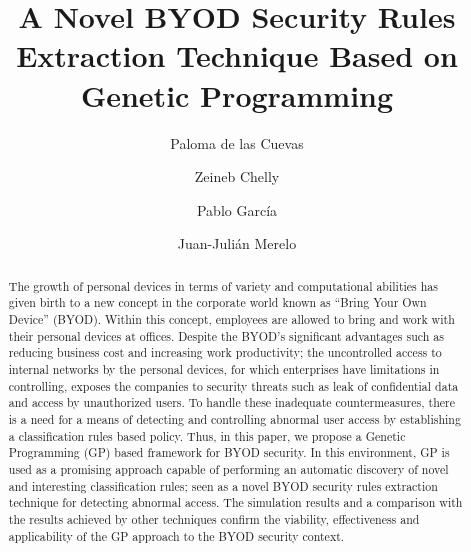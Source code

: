 \documentclass[runningheads,a4paper]{llncs}
\begin{document}
\mainmatter  %

\title{A Novel BYOD Security Rules Extraction Technique Based on Genetic Programming}


%
\author{Paloma de las Cuevas %
\and Zeineb Chelly \and Pablo Garc\'ia \and Juan-Juli\'an Merelo }
%


\maketitle


\begin{abstract}
The growth of personal devices in terms of variety and computational
abilities has given birth to a new concept in the corporate world
known as ``Bring Your Own Device'' (BYOD).
Within this concept,
employees are allowed to bring and work with their personal devices at
offices. Despite the BYOD's significant advantages such as reducing
business cost and increasing work productivity; the uncontrolled
access to internal networks by the personal devices, for which
enterprises have limitations in controlling, exposes the companies to
security threats such as leak of confidential data and access by
unauthorized users. To handle these inadequate countermeasures,
 there
is a need for a means of detecting and controlling abnormal user
access by establishing a classification rules based policy. Thus, in
this paper, we propose a Genetic Programming (GP) based framework for
BYOD security. In this environment, GP is used as a promising approach
capable of performing an automatic discovery of novel and interesting
classification rules; seen as a novel BYOD security rules extraction
technique for detecting abnormal access. The simulation results and a
comparison with the results achieved by other techniques confirm the
viability, effectiveness and applicability of the GP approach to the
BYOD security context.
\end{abstract}
\end{document}
